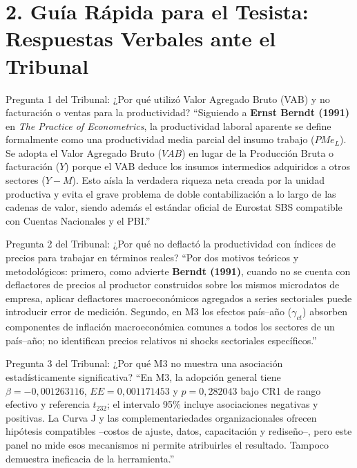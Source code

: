 \documentclass[10pt,a4paper,landscape]{article}
\begin{document}
\newpage

\section*{2. Guía Rápida para el Tesista: Respuestas Verbales ante el Tribunal}

\begin{qspeechbox}{Pregunta 1 del Tribunal: ¿Por qué utilizó Valor Agregado Bruto (VAB) y no facturación o ventas para la productividad?}
  ``Siguiendo a \textbf{Ernst Berndt (1991)} en \textit{The Practice of Econometrics}, la productividad laboral aparente se define formalmente como una productividad media parcial del insumo trabajo ($PMe_L$). Se adopta el Valor Agregado Bruto ($VAB$) en lugar de la Producción Bruta o facturación ($Y$) porque el VAB deduce los insumos intermedios adquiridos a otros sectores ($Y - M$). Esto aísla la verdadera riqueza neta creada por la unidad productiva y evita el grave problema de doble contabilización a lo largo de las cadenas de valor, siendo además el estándar oficial de Eurostat SBS compatible con Cuentas Nacionales y el PBI.''
\end{qspeechbox}

\vspace{0.25cm}

\begin{qspeechbox}{Pregunta 2 del Tribunal: ¿Por qué no deflactó la productividad con índices de precios para trabajar en términos reales?}
  ``Por dos motivos teóricos y metodológicos: primero, como advierte \textbf{Berndt (1991)}, cuando no se cuenta con deflactores de precios al productor construidos sobre los mismos microdatos de empresa, aplicar deflactores macroeconómicos agregados a series sectoriales puede introducir error de medición. Segundo, en M3 los efectos país--año ($\gamma_{ct}$) absorben componentes de inflación macroeconómica comunes a todos los sectores de un país--año; no identifican precios relativos ni shocks sectoriales específicos.''
\end{qspeechbox}

\vspace{0.25cm}

\begin{qspeechbox}{Pregunta 3 del Tribunal: ¿Por qué M3 no muestra una asociación estadísticamente significativa?}
  ``En M3, la adopción general tiene $\beta=-0{,}001263116$, $EE=0{,}001171453$ y $p=0{,}282043$ bajo CR1 de rango efectivo y referencia $t_{232}$; el intervalo 95\% incluye asociaciones negativas y positivas. La Curva J y las complementariedades organizacionales ofrecen hipótesis compatibles --costos de ajuste, datos, capacitación y rediseño--, pero este panel no mide esos mecanismos ni permite atribuirles el resultado. Tampoco demuestra ineficacia de la herramienta.''
\end{qspeechbox}
\end{document}
